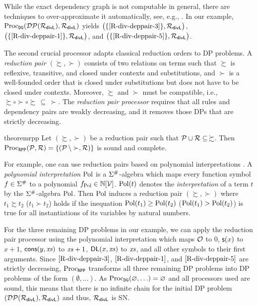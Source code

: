 While the exact dependency graph is not computable in general, there are 
techniques to over-approximate it automatically, see, e.g.,
\cite{arts2000termination,giesl2006mechanizing,hirokawa2005automating}.
In our example, $\operatorname{Proc}_{\mathtt{DG}}(\mathcal{DP}(\mathcal{R}_{\mathsf{divL}}), \mathcal{R}_{\mathsf{divL}})$ yields
$\bigl(\{\eqref{R-div-deppair-3}\}, \mathcal{R}_{\mathsf{divL}}\bigr)$,
$\bigl(\{\eqref{R-div-deppair-1}\}, \mathcal{R}_{\mathsf{divL}}\bigr)$,
 and $\bigl(\{\eqref{R-div-deppair-5}\}, \mathcal{R}_{\mathsf{divL}}\bigr)$.

The second crucial processor adapts classical reduction orders to DP problems.
A \emph{reduction pair} $(\succsim, \succ)$ consists of two \pagebreak[2]
relations on terms such that $\succsim$
is reflexive, transitive, and
closed under contexts and substitutions, and $\succ$ is a well-founded
order that is closed under substitutions but does
not have to be closed under contexts.
Moreover, $\succsim$ and $\succ$ must be compatible, 
i.e., ${\succsim} \circ {\succ} \circ {\succsim} \, \subseteq \, {\succ}$.
The \emph{reduction pair processor}
requires that all rules and dependency pairs are weakly decreasing,
and it removes those DPs that are strictly decreasing.

\begin{restatable}{theorem}{rpp}\label{RPP}
    Let $(\succsim, \succ)$ be a reduction pair such that $\mathcal{P} \cup \mathcal{R} \subseteq \, \succsim$.
    Then $\operatorname{Proc}_{\mathtt{RPP}}(\mathcal{P},\mathcal{R}) = \{(\mathcal{P} \, \setminus \succ, \mathcal{R})\}$ is sound and complete.
\end{restatable}

For example, one can use reduction pairs based on
polynomial interpretations \cite{lankford1979proving}.
A \emph{polynomial interpretation} $\operatorname{Pol}$ is a $\Sigma^\#$-algebra which maps every
function symbol $f \in \Sigma^\#$ to a polynomial $f_{\operatorname{Pol}} \in \mathbb{N}[\mathcal{V}]$.
$\operatorname{Pol}(t)$ denotes the \emph{interpretation} of a term $t$ by the $\Sigma^\#$-algebra $\operatorname{Pol}$.
Then $\operatorname{Pol}$ induces a reduction pair
$(\succsim, \succ)$ where $t_1 \succsim t_2$ ($t_1 \succ t_2$) holds if the inequation $\operatorname{Pol}(t_1) \geq \operatorname{Pol}(t_2)$
($\operatorname{Pol}(t_1) > \operatorname{Pol}(t_2)$) is true for all
instantiations of its variables by natural numbers.



For the three remaining
DP problems in our example, we can apply
the reduction pair processor using
the polynomial interpretation
which maps $\mathcal{O}$ to $0$, $\mathsf{s}(x)$ to $x + 1$,
$\mathsf{cons}(y,\mathit{xs})$ to $\mathit{xs} + 1$, $\mathsf{DL}(x,\mathit{xs})$ to $\mathit{xs}$,
and all other symbols to their first arguments. 
Since $\eqref{R-div-deppair-3}$, $\eqref{R-div-deppair-1}$,
and $\eqref{R-div-deppair-5}$ are strictly decreasing, 
$\operatorname{Proc}_{\mathtt{RPP}}$ transforms all three remaining DP problems 
into DP problems of the form $(\emptyset, \ldots)$. 
As $\operatorname{Proc}_{\mathtt{DG}}(\varnothing, \ldots) = \varnothing$ 
and all processors used are sound, this means that there is no
infinite chain for the initial DP problem 
$(\mathcal{DP}(\mathcal{R}_{\mathsf{divL}}), \mathcal{R}_{\mathsf{divL}})$ and thus, $\mathcal{R}_{\mathsf{divL}}$ is SN.

